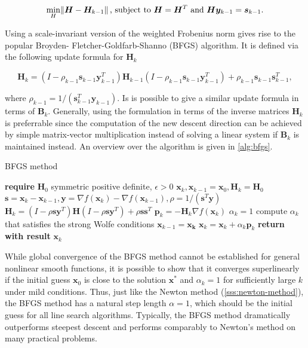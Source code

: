\begin{align*}
    \min_{H} \norm{\bm{H} - \bm{H}_{k-1}} \text{, subject to } \bm{H} = \bm{H}^T \text{ and } \bm{H}\bm{y}_{k-1} = \bm{s}_{k-1}.
\end{align*}

Using a scale-invariant version of the weighted Frobenius norm gives rise to the popular Broyden- Fletcher-Goldfarb-Shanno (BFGS) algorithm.
It is defined via the following update formula for $\bm{H}_k$

\begin{equation}\label{eq:bfgs-update}
    \bm{H}_k = (I - \rho_{k-1}\bm{s}_{k-1}\bm{y}^T_{k-1})\bm{H}_{k-1}(I - \rho_{k-1}\bm{s}_{k-1}\bm{y}^T_{k-1}) + \rho_{k-1}\bm{s}_{k-1}\bm{s}^T_{k-1},
\end{equation}

\noindent where $\rho_{k-1} = 1 / (\bm{s}^T_{k-1}\bm{y}_{k-1})$. Is is possible to give a similar update formula in terms of $\bm{B}_k$.
Generally, using the formulation in terms of the inverse matrices $\bm{H}_k$ is preferrable since the computation of the new descent 
direction can
be achieved by simple matrix-vector multiplication instead of solving a linear system if $\bm{B}_k$ is maintained instead. An overview over the
algorithm is given in \cref{alg:bfgs}.

\begin{algorithm}
\caption{BFGS method}\label{alg:bfgs}
\begin{algorithmic}
\State \textbf{require } $\bm{H}_0$ symmetric positive definite, $\epsilon > 0$
\State $\bm{x}_k, \bm{x}_{k-1} = \bm{x}_0, \bm{H}_k = \bm{H}_0 $
\State $\bm{s} = \bm{x}_k - \bm{x}_{k-1}, \bm{y} = \nabla f(\bm{x}_k) - \nabla f(\bm{x}_{k-1}), \rho = 1 / (\bm{s}^T \bm{y})$
\State $\bm{H}_k = (I - \rho \bm{s} \bm{y}^T) \bm{H}(I - \rho \bm{s} \bm{y}^T) + \rho\bm{s}\bm{s}^T$
\State $\bm{p}_k = -\bm{H}_k \nabla f(\bm{x}_k)$
\State $\alpha_k = 1$
\State compute $\alpha_k$ that satisfies the strong Wolfe conditions
\EndIf
\State $\bm{x}_{k-1} = \bm{x_k}$
\State $\bm{x}_k = \bm{x}_k + \alpha_k \bm{p}_k$
\EndWhile
\State \textbf{return with result } $\bm{x}_k$
\EndProcedure
\end{algorithmic}
\end{algorithm}

While global convergence of the BFGS method cannot be established for general nonlinear smooth functions, it is possible to show that it converges 
superlinearly if the initial guess $\bm{x}_0$ is close to the solution $\bm{x}^*$ and $\alpha_k = 1$ for sufficiently large $k$ \cite{nocedal2006}
under mild conditions. Thus, just like the Newton method (\cref{sss:newton-method}), the BFGS method has a natural step length $\alpha=1$,
which should be the initial guess for all line search algorithms. Typically, the BFGS method dramatically outperforms steepest 
descent and performs comparably to Newton's method on many practical problems. 

